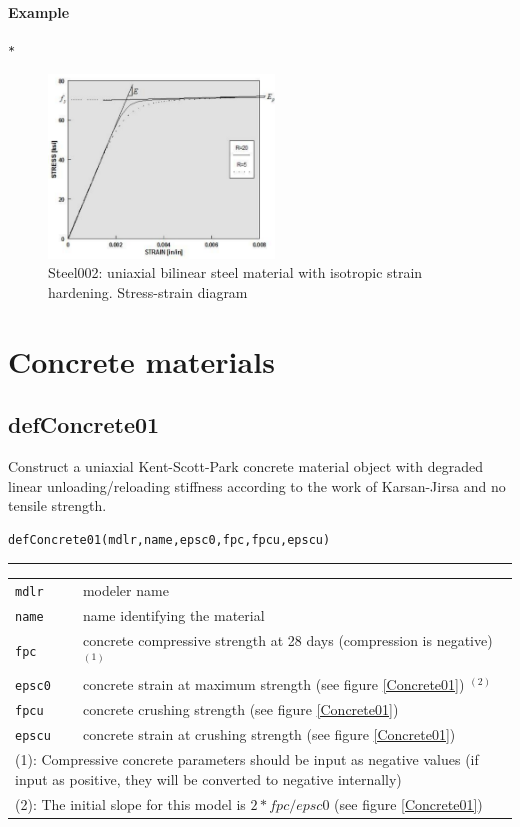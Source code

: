 \paragraph{Example}
\begin{verbatim}
*
\end{verbatim}

\begin{figure}[h]
\centering
\includegraphics[width=60mm]{materials/figures/Steel02Monotonic}
\caption{Steel002: uniaxial bilinear steel material with isotropic strain hardening. Stress-strain diagram}\label{Steel02}
\end{figure}

\section{Concrete materials}
\subsection{defConcrete01}
\noindent Construct a uniaxial Kent-Scott-Park concrete material object with degraded linear unloading/reloading stiffness according to the work of Karsan-Jirsa and no tensile strength.
\begin{verbatim}
defConcrete01(mdlr,name,epsc0,fpc,fpcu,epscu)
\end{verbatim}
\vspace{-10pt}
{\color{grayLines} \rule{\linewidth}{0.25pt}}
\begin{center}
\begin{tabular}{lp{10cm}}
{\tt mdlr} & modeler name \\
{\tt name} & name identifying the material \\
{\tt fpc} &  concrete compressive strength at 28 days (compression is negative) $^{(1)}$\\
{\tt epsc0} &  concrete strain at maximum strength (see figure \ref{Concrete01}) $^{(2)}$\\
{\tt fpcu} &  concrete crushing strength (see figure \ref{Concrete01}) \\
{\tt epscu} &  concrete strain at crushing strength (see figure \ref{Concrete01}) \\
\hline
\multicolumn{2}{p{12cm}}{\footnotesize(1): Compressive concrete parameters should be input as negative values (if input as positive, they will be converted to negative internally)}\\
\multicolumn{2}{p{12cm}}{\footnotesize (2): The initial slope for this model is $2*fpc/epsc0$ (see figure \ref{Concrete01})}\\
\end{tabular}
\end{center}
